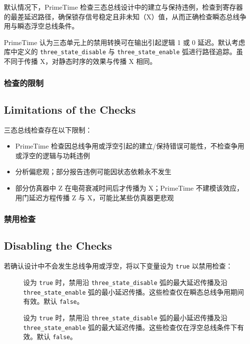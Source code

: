 默认情况下，PrimeTime 检查三态总线设计中的建立与保持违例，检查到寄存器的最差延迟路径，确保锁存信号稳定且非未知（X）值，从而正确检查瞬态总线争用与瞬态浮空总线条件。

PrimeTime 认为三态单元上的禁用转换可在输出引起逻辑 1 或 0 延迟。默认考虑库中定义的 \texttt{three\_state\_disable} 与 \texttt{three\_state\_enable} 弧进行路径追踪。虽不同于传播 X，对静态时序的效果与传播 X 相同。

\subsubsection{检查的限制}
\subsection*{Limitations of the Checks}

三态总线检查存在以下限制：
\begin{itemize}
  \item PrimeTime 检查因总线争用或浮空引起的建立/保持错误可能性，不检查争用或浮空的逻辑与功耗违例
  \item 分析偏悲观；部分报告违例可能因状态依赖永不发生
  \item 部分仿真器中 Z 在电荷衰减时间后才传播为 X；PrimeTime 不建模该效应，用门延迟方程传播 Z 与 X，可能比某些仿真器更悲观
\end{itemize}

\subsubsection{禁用检查}
\subsection*{Disabling the Checks}

若确认设计中不会发生总线争用或浮空，将以下变量设为 \texttt{true} 以禁用检查：
\begin{description}
  \item[] 设为 \texttt{true} 时，禁用沿 \texttt{three\_state\_disable} 弧的最大延迟传播及沿 \texttt{three\_state\_enable} 弧的最小延迟传播。这些检查仅在瞬态总线争用期间有效。默认 \texttt{false}。
  \item[] 设为 \texttt{true} 时，禁用沿 \texttt{three\_state\_disable} 弧的最小延迟传播及沿 \texttt{three\_state\_enable} 弧的最大延迟传播。这些检查仅在浮空总线条件下有效。默认 \texttt{false}。
\end{description}

